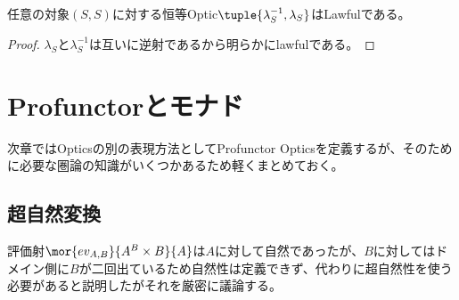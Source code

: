\documentclass[uplatex,dvipdfmx]{jsarticle}
\begin{document}
  \begin{prop}[恒等Opticのlawful性]  
    任意の対象$(S,S)$に対する恒等Optic$\tuple{\lambda_S^{-1},\lambda_S}$はLawfulである。
  \end{prop}
  \begin{proof}
    $\lambda_S$と$\lambda_S^{-1}$は互いに逆射であるから明らかにlawfulである。
  \end{proof}
  \section{Profunctorとモナド}
  次章ではOpticsの別の表現方法としてProfunctor Opticsを定義するが、そのために必要な圏論の知識がいくつかあるため軽くまとめておく。
  \subsection{超自然変換}
  評価射$\mor{ev_{A,B}}{A^B\times B}{A}$は$A$に対して自然であったが、$B$に対してはドメイン側に$B$が二回出ているため自然性は定義できず、代わりに超自然性を使う必要があると説明したがそれを厳密に議論する。
\end{document}
